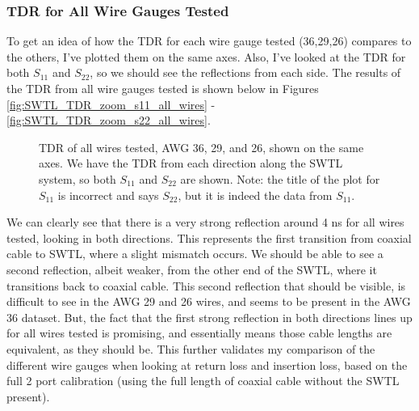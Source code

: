 \documentclass[12pt,onecolumn,titlepage]{article}
\begin{document}
\subsubsection{TDR for All Wire Gauges Tested}
\indent \indent To get an idea of how the TDR for each wire gauge tested (36,29,26) compares to the others, I've plotted them on the same axes. Also, I've looked at the TDR for both $S_{11}$ and $S_{22}$, so we should see the reflections from each side. The results of the TDR from all wire gauges tested is shown below in Figures \ref{fig:SWTL_TDR_zoom_s11_all_wires} - \ref{fig:SWTL_TDR_zoom_s22_all_wires}.


\begin{figure}[htbp]
	\centering
		\quad
	\label{fig:SWTL_TDR_zoom_all_wires}
	\caption{TDR of all wires tested, AWG 36, 29, and 26, shown on the same axes. We have the TDR from each direction along the SWTL system, so both $S_{11}$ and $S_{22}$ are shown. Note: the title of the plot for $S_{11}$ is incorrect and says $S_{22}$, but it is indeed the data from $S_{11}$.}
\end{figure}


We can clearly see that there is a very strong reflection around 4 ns for all wires tested, looking in both directions. This represents the first transition from coaxial cable to SWTL, where a slight mismatch occurs. We should be able to see a second reflection, albeit weaker, from the other end of the SWTL, where it transitions back to coaxial cable. This second reflection that should be visible, is difficult to see in the AWG 29 and 26 wires, and seems to be present in the AWG 36 dataset. But, the fact that the first strong reflection in both directions lines up for all wires tested is promising, and essentially means those cable lengths are equivalent, as they should be. This further validates my comparison of the different wire gauges when looking at return loss and insertion loss, based on the full 2 port calibration (using the full length of coaxial cable without the SWTL present).
\end{document}
